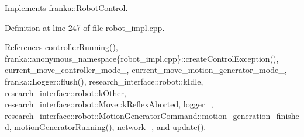 Implements \hyperlink{classfranka_1_1RobotControl_aae1629178b5eeb5d8e4d41d2f746f2fc}{franka\+::\+Robot\+Control}.



Definition at line 247 of file robot\+\_\+impl.\+cpp.



References controller\+Running(), franka\+::anonymous\+\_\+namespace\{robot\+\_\+impl.\+cpp\}\+::create\+Control\+Exception(), current\+\_\+move\+\_\+controller\+\_\+mode\+\_\+, current\+\_\+move\+\_\+motion\+\_\+generator\+\_\+mode\+\_\+, franka\+::\+Logger\+::flush(), research\+\_\+interface\+::robot\+::k\+Idle, research\+\_\+interface\+::robot\+::k\+Other, research\+\_\+interface\+::robot\+::\+Move\+::k\+Reflex\+Aborted, logger\+\_\+, research\+\_\+interface\+::robot\+::\+Motion\+Generator\+Command\+::motion\+\_\+generation\+\_\+finished, motion\+Generator\+Running(), network\+\_\+, and update().


